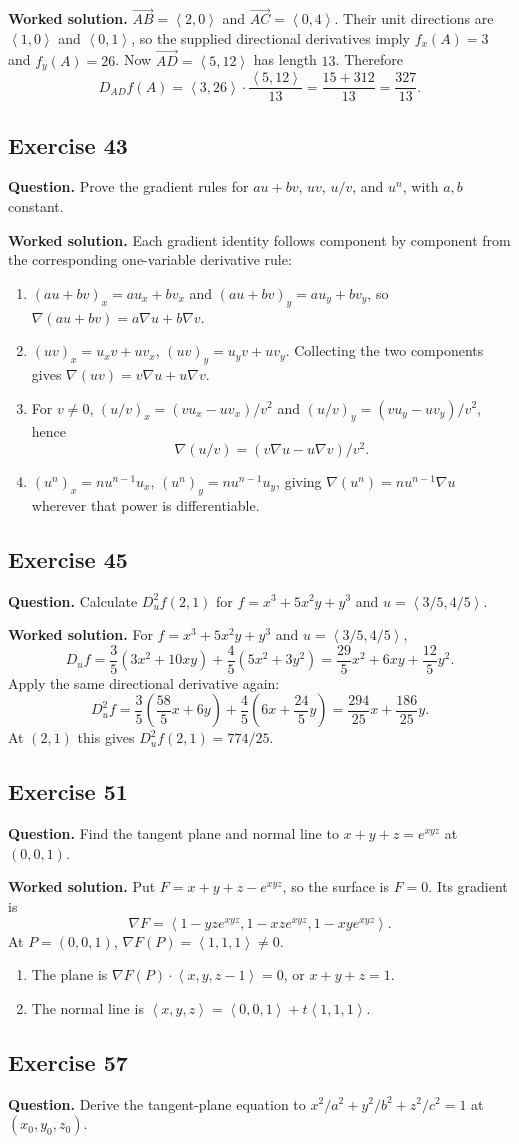 \documentclass[11pt]{article}
\newcommand{\ex}[1]{\Needspace{8\baselineskip}\subsection*{Exercise #1}}
\newcommand{\ans}[1]{\boxed{#1}}
\newcommand{\vv}[1]{\left\langle #1\right\rangle}
\begin{document}
\textbf{Worked solution.}
$\overrightarrow{AB}=\vv{2,0}$ and $\overrightarrow{AC}=\vv{0,4}$. Their unit directions are $\vv{1,0}$ and $\vv{0,1}$, so the supplied directional derivatives imply $f_x(A)=3$ and $f_y(A)=26$. Now $\overrightarrow{AD}=\vv{5,12}$ has length $13$. Therefore
\[\ans{D_{AD}f(A)=\vv{3,26}\cdot\frac{\vv{5,12}}{13}=\frac{15+312}{13}=\frac{327}{13}}.\]
\ex{43}
\textbf{Question.} Prove the gradient rules for $au+bv$, $uv$, $u/v$, and $u^n$, with $a,b$ constant.

\textbf{Worked solution.}
Each gradient identity follows component by component from the corresponding one-variable derivative rule:
\begin{enumerate}[label=(\alph*)]
\item $(au+bv)_x=au_x+bv_x$ and $(au+bv)_y=au_y+bv_y$, so $\ans{\nabla(au+bv)=a\nabla u+b\nabla v}$.
\item $(uv)_x=u_xv+uv_x$, $(uv)_y=u_yv+uv_y$. Collecting the two components gives $\ans{\nabla(uv)=v\nabla u+u\nabla v}$.
\item For $v\ne0$, $(u/v)_x=(vu_x-uv_x)/v^2$ and $(u/v)_y=(vu_y-uv_y)/v^2$, hence
\[\ans{\nabla(u/v)=(v\nabla u-u\nabla v)/v^2}.\]
\item $(u^n)_x=nu^{n-1}u_x$, $(u^n)_y=nu^{n-1}u_y$, giving $\ans{\nabla(u^n)=nu^{n-1}\nabla u}$ wherever that power is differentiable.
\end{enumerate}
\ex{45}
\textbf{Question.} Calculate $D_u^2f(2,1)$ for $f=x^3+5x^2y+y^3$ and $u=\vv{3/5,4/5}$.

\textbf{Worked solution.}
For $f=x^3+5x^2y+y^3$ and $u=\vv{3/5,4/5}$,
\[D_uf=\frac35(3x^2+10xy)+\frac45(5x^2+3y^2)
=\frac{29}5x^2+6xy+\frac{12}5y^2.\]
Apply the same directional derivative again:
\[D_u^2f=\frac35\left(\frac{58}5x+6y\right)+\frac45\left(6x+\frac{24}5y\right)
=\frac{294}{25}x+\frac{186}{25}y.\]
At $(2,1)$ this gives $\ans{D_u^2f(2,1)=774/25}$.
\ex{51}
\textbf{Question.} Find the tangent plane and normal line to $x+y+z=e^{xyz}$ at $(0,0,1)$.

\textbf{Worked solution.}
Put $F=x+y+z-e^{xyz}$, so the surface is $F=0$. Its gradient is
\[\nabla F=\vv{1-yze^{xyz},1-xze^{xyz},1-xye^{xyz}}.\]
At $P=(0,0,1)$, $\nabla F(P)=\vv{1,1,1}\ne0$.
\begin{enumerate}[label=(\alph*)]
\item The plane is $\nabla F(P)\cdot\vv{x,y,z-1}=0$, or $\ans{x+y+z=1}$.
\item The normal line is $\ans{\vv{x,y,z}=\vv{0,0,1}+t\vv{1,1,1}}$.
\end{enumerate}
\ex{57}
\textbf{Question.} Derive the tangent-plane equation to $x^2/a^2+y^2/b^2+z^2/c^2=1$ at $(x_0,y_0,z_0)$.
\end{document}
